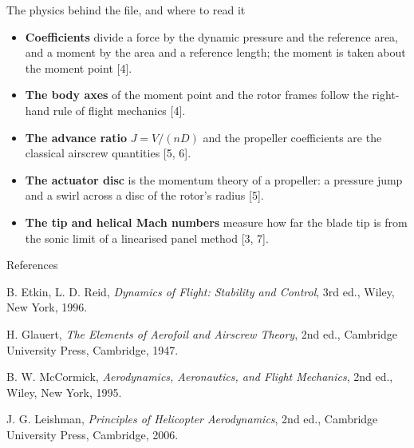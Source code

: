 %
\begin{frame}{The physics behind the file, and where to read it}
\begin{itemize}\small
  \item \textbf{Coefficients} divide a force by the dynamic pressure and the
        reference area, and a moment by the area and a reference length; the
        moment is taken about the moment point [4].
  \item \textbf{The body axes} of the moment point and the rotor frames
        follow the right-hand rule of flight mechanics [4].
  \item \textbf{The advance ratio} \(J = V/(nD)\) and the propeller
        coefficients are the classical airscrew quantities [5, 6].
  \item \textbf{The actuator disc} is the momentum theory of a propeller: a
        pressure jump and a swirl across a disc of the rotor's radius [5].
  \item \textbf{The tip and helical Mach numbers} measure how far the blade
        tip is from the sonic limit of a linearised panel method [3, 7].
\end{itemize}
\end{frame}

\begin{frame}{References}
\begin{reflist}
\item {}
\item {}
\item {}
\item B. Etkin, L. D. Reid, \emph{Dynamics of Flight: Stability and
      Control}, 3rd ed., Wiley, New York, 1996.
\item H. Glauert, \emph{The Elements of Aerofoil and Airscrew Theory}, 2nd
      ed., Cambridge University Press, Cambridge, 1947.
\item B. W. McCormick, \emph{Aerodynamics, Aeronautics, and Flight
      Mechanics}, 2nd ed., Wiley, New York, 1995.
\item J. G. Leishman, \emph{Principles of Helicopter Aerodynamics}, 2nd
      ed., Cambridge University Press, Cambridge, 2006.
\end{reflist}
\end{frame}
